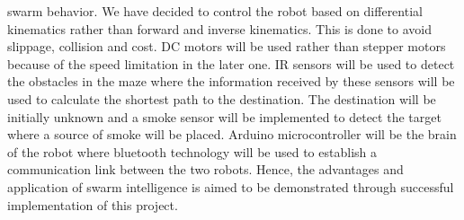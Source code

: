 swarm behavior. We have decided to control the robot based on differential kinematics rather than
forward and inverse kinematics. This is done to avoid slippage, collision and cost. DC motors will be
used rather than stepper motors because of the speed limitation in the later one. IR sensors will be used
to detect the obstacles in the maze where the information received by these sensors will be used to
calculate the shortest path to the destination. The destination will be initially unknown and a smoke
sensor will be implemented to detect the target where a source of smoke will be placed. Arduino
microcontroller will be the brain of the robot where bluetooth technology will be used to establish a
communication link between the two robots. Hence, the advantages and application of swarm
intelligence is aimed to be demonstrated through successful implementation of this project.